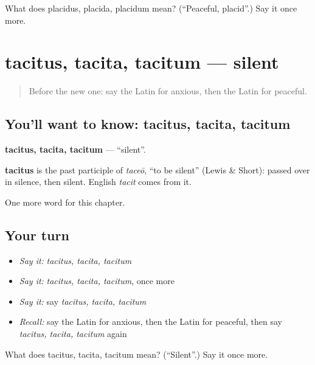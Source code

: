 \begin{tcolorbox}[breakable,colback=teal!4,colframe=teal!35!black,title={Before you move on}]
What does placidus, placida, placidum mean? (\textquotedblleft{}Peaceful, placid\textquotedblright{}.) Say it once more.
\end{tcolorbox}
\section[tacitus, tacita, tacitum]{tacitus, tacita, tacitum — silent}

\label{lesson:LA-C212-tacitus}



\begin{quote}
Before the new one: say the Latin for anxious, then the Latin for peaceful.
\end{quote}

\subsection*{You'll want to know: tacitus, tacita, tacitum}
\textbf{tacitus, tacita, tacitum} — \textquotedblleft{}silent\textquotedblright{}.

\begin{cousinweb}
\textbf{tacitus} is the past participle of \emph{taceō}, \textquotedblleft{}to be silent\textquotedblright{} (Lewis \& Short): passed over in silence, then silent. English \emph{tacit} comes from it.
\end{cousinweb}

\begin{grammarlens}[title={What you've built}]
One more word for this chapter.
\end{grammarlens}

\subsection*{Your turn}
\begin{itemize}
\raggedright
  \item \emph{Say it:} \emph{tacitus, tacita, tacitum}
  \item \emph{Say it:} \emph{tacitus, tacita, tacitum}, once more
  \item \emph{Say it:} say \emph{tacitus, tacita, tacitum}
  \item \emph{Recall:} say the Latin for anxious, then the Latin for peaceful, then say \emph{tacitus, tacita, tacitum} again
\end{itemize}

\begin{tcolorbox}[breakable,colback=teal!4,colframe=teal!35!black,title={Before you move on}]
What does tacitus, tacita, tacitum mean? (\textquotedblleft{}Silent\textquotedblright{}.) Say it once more.
\end{tcolorbox}
